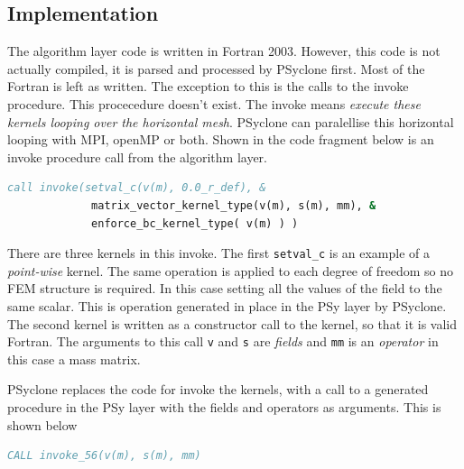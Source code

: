 \documentclass[review,times]{elsarticle}
\begin{document}
\subsection{Implementation}
The algorithm layer code is written in Fortran 2003. However, this
code is not actually compiled, it is parsed and processed by PSyclone
first. Most of the Fortran is left as written. The exception to this
is the calls to the invoke procedure. This procecedure doesn't
exist. The invoke means {\em execute these kernels looping over the horizontal
mesh}. PSyclone can paralellise this horizontal looping with MPI,
openMP or both. Shown in the code fragment below is an invoke
procedure call from the algorithm layer.

\begin{lstlisting}[language=Fortran,caption={Code fragment showing an
invoke procedure from the Algorithm layer},label={lst:invoke}]
 call invoke(setval_c(v(m), 0.0_r_def), &
             matrix_vector_kernel_type(v(m), s(m), mm), &
             enforce_bc_kernel_type( v(m) ) )
\end{lstlisting}

There are three kernels in this invoke. The first \verb+setval_c+ is
an example of a {\em point-wise} kernel. The same operation is applied
to each degree of freedom so no FEM structure is required. In this
case setting all the values of the field to the same scalar. This is
operation generated in place in the PSy layer by PSyclone. The second
kernel is written as a constructor call to the kernel, so that it is
valid Fortran. The arguments to this call \verb+v+ and \verb+s+ are
{\em fields} and \verb+mm+ is an {\em operator} in this case a mass
matrix.

PSyclone replaces the code for invoke the kernels, with a call to a
generated procedure in the PSy layer with the fields and operators as
arguments. This is shown below
\begin{lstlisting}[language=Fortran,caption={Code fragment showing the
generated Algorithm layer code},label={lst:invoke_56}]
 CALL invoke_56(v(m), s(m), mm)
\end{lstlisting}
\end{document}
